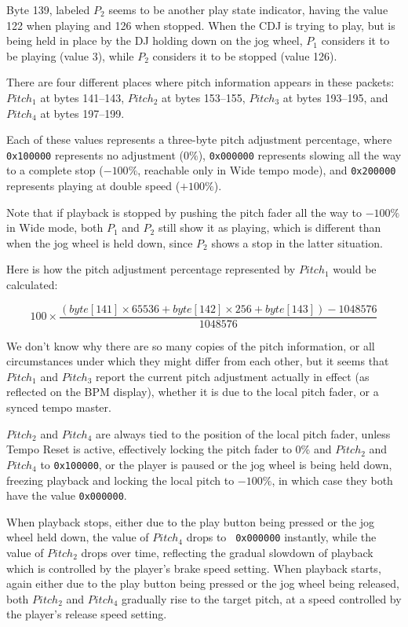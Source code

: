 \documentclass[11pt]{article}
\begin{document}
Byte 139, labeled $P_2$ seems to be another play state indicator,
having the value 122 when playing and 126 when stopped. When the CDJ
is trying to play, but is being held in place by the DJ holding down
on the jog wheel, $P_1$ considers it to be playing (value 3), while
$P_2$ considers it to be stopped (value 126).

There are four different places where pitch information appears in
these packets: $Pitch_1$ at bytes 141--143, $Pitch_2$ at bytes
153--155, $Pitch_3$ at bytes 193--195, and $Pitch_4$ at bytes
197--199.

Each of these values represents a three-byte pitch adjustment
percentage, where {\tt 0x100000} represents no adjustment ($0\%$),
{\tt 0x000000} represents slowing all the way to a complete stop
($-100\%$, reachable only in Wide tempo mode), and {\tt 0x200000}
represents playing at double speed ($+100\%$).

Note that if playback is stopped by pushing the pitch fader all the
way to $-100\%$ in Wide mode, both $P_1$ and $P_2$ still show it as
playing, which is different than when the jog wheel is held down,
since $P_2$ shows a stop in the latter situation.

Here is how the pitch adjustment percentage represented by $Pitch_1$
would be calculated:

\begin{displaymath}
  100 \times
  \frac{(byte[141] \times 65536 + byte[142]  \times 256 + byte[143]) - 1048576}{1048576}
\end{displaymath}

We don't know why there are so many copies of the pitch information,
or all circumstances under which they might differ from each other,
but it seems that $Pitch_1$ and $Pitch_3$ report the current pitch
adjustment actually in effect (as reflected on the BPM display),
whether it is due to the local pitch fader, or a synced tempo master.

$Pitch_2$ and $Pitch_4$ are always tied to the position of the local
pitch fader, unless Tempo Reset is active, effectively locking the
pitch fader to 0\% and $Pitch_2$ and $Pitch_4$ to {\tt 0x100000}, or
the player is paused or the jog wheel is being held down, freezing
playback and locking the local pitch to $-100\%$, in which case they
both have the value {\tt 0x000000}.

When playback stops, either due to the play button being pressed or
the jog wheel held down, the value of $Pitch_4$ drops to {\tt
  0x000000} instantly, while the value of $Pitch_2$ drops over time,
reflecting the gradual slowdown of playback which is controlled by the
player's brake speed setting. When playback starts, again either due
to the play button being pressed or the jog wheel being released, both
$Pitch_2$ and $Pitch_4$ gradually rise to the target pitch, at a speed
controlled by the player's release speed setting.
\end{document}
